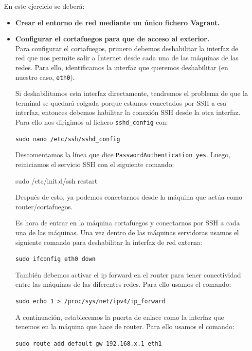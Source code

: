 \documentclass[12pt,letterpaper]{article}
\begin{document}
En este ejercicio se deberá:
\begin{itemize}
	\item \textbf{Crear el entorno de red mediante un único fichero Vagrant.}
	
	
	\item \textbf{Configurar el cortafuegos para que de acceso al exterior.} \\
	Para configurar el cortafuegos, primero debemos deshabilitar la interfaz de red que nos permite salir a Internet desde cada una de las máquinas de las redes. Para ello, identificamos la interfaz que queremos deshabilitar (en nuestro caso, \texttt{eth0}).
	
	Si deshabilitamos esta interfaz directamente, tendremos el problema de que la terminal se quedará colgada porque estamos conectados por SSH a esa interfaz, entonces debemos habilitar la conexión SSH desde la otra interfaz. Para ello nos dirigimos al fichero \texttt{sshd\_config} con:
	\begin{center}
		\texttt{sudo nano /etc/ssh/sshd\_config}
	\end{center}
	
	Descomentamos la línea que dice \texttt{PasswordAuthentication yes}. Luego, reiniciamos el servicio SSH con el siguiente comando:
	\begin{center}
		sudo /etc/init.d/ssh restart
	\end{center}

	Después de esto, ya podemos conectarnos desde la máquina que actúa como router/cortafuegos.
	
	Es hora de entrar en la máquina cortafuegos y conectarnos por SSH a cada una de las máquinas. Una vez dentro de las máquinas servidoras usamos el siguiente comando para deshabilitar la interfaz de red externa:
	\begin{center}
		\texttt{sudo ifconfig eth0 down}
	\end{center}
	
	También debemos activar el ip forward en el router para tener conectividad entre las máquinas de las diferentes redes. Para ello usamos el comando:
	\begin{center}
		\texttt{sudo echo 1 > /proc/sys/net/ipv4/ip\_forward}
	\end{center}
	
	A continuación, establecemos la puerta de enlace como la interfaz que tenemos en la máquina que hace de router. Para ello usamos el comando:
	\begin{center}
		\texttt{sudo route add default gw 192.168.x.1 eth1}
	\end{center}


\end{itemize}
\end{document}
